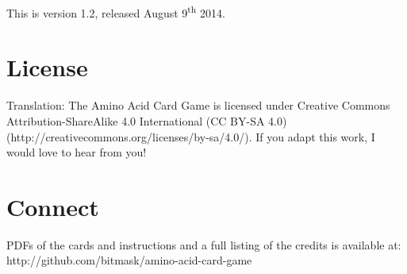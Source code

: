 \documentclass[a4paper,11pt,oneside]{memoir}
\begin{document}
This is version 1.2, released August 9\textsuperscript{th} 2014.  


\section*{License}

Translation: The Amino Acid Card Game is licensed under \cc Creative Commons Attribution-ShareAlike 4.0 International (CC BY-SA 4.0)
(http://creativecommons.org/licenses/by-sa/4.0/).
If you adapt this work, I would love to hear from you!


\section*{Connect}

PDFs of the cards and instructions and a full listing of the credits is available at: 
http://github.com/bitmask/amino-acid-card-game

\end{document}
